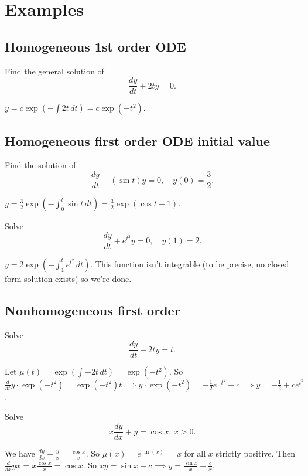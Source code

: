 \section{Examples}
\subsection{Homogeneous 1st order ODE}
\begin{prob}
    Find the general solution of \[
    \frac{dy}{dt}+2ty=0.
    \] 
\end{prob}
\begin{solution}
    $y=c \exp \left(-\int 2t \, dt  \right) =c\exp\left( -t^2 \right) $.
\end{solution}
\subsection{Homogeneous first order ODE initial value}
\begin{prob}
    Find the solution of \[
        \frac{dy}{dt}+(\sin t)y=0,\quad y(0)=\frac{3}{2}.
    \] 
\end{prob}
\begin{solution}
    $y=\frac{3}{2}\exp\left( -\int_{0}^{t} \sin t \, dt \right) =\frac{3}{2}\exp(\cos t -1)$.
\end{solution}
\begin{prob}
    Solve \[
        \frac{dy}{dt}+e^{t^2}y=0,\quad y(1)=2.
    \] 
\end{prob}
\begin{solution}
    $y=2\exp\left( -\int_{1}^{t} e^{t^2} \, dt \right) $. This function isn't integrable (to be precise, no closed form solution exists) so we're done.
\end{solution}
\subsection{Nonhomogeneous first order}
\begin{prob}
    Solve \[
    \frac{dy}{dt}-2ty=t.
    \] 
\end{prob}
\begin{solution}
    Let $\mu(t)= \exp\left( \int -2t \, dt \right) =\exp\left( -t^2 \right) $. So $\frac{d}{dt} y\cdot \exp\left( -t^2 \right) =\exp\left( -t^2 \right) t \implies y\cdot \exp(-t^2)=-\frac{1}{2}e^{-t^2}+c\implies y=-\frac{1}{2}+ce^{t^2}$.
\end{solution}
\begin{prob}
    Solve \[
   x \frac{dy}{dx}+y=\cos x,\, x>0. 
    \] 
\end{prob}
\begin{solution}
    We have $\frac{dy}{dx}+\frac{y}{x}=\frac{\cos x}{x}$. So $\mu(x)=e^{|\ln(x)|}=x$ for all $x$ strictly positive. Then $\frac{d}{dx}yx=x  \frac{\cos x}{x}=\cos x$. So $xy=\sin x +c\implies y= \frac{\sin x}{x}+\frac{c}{x}$.
\end{solution}
